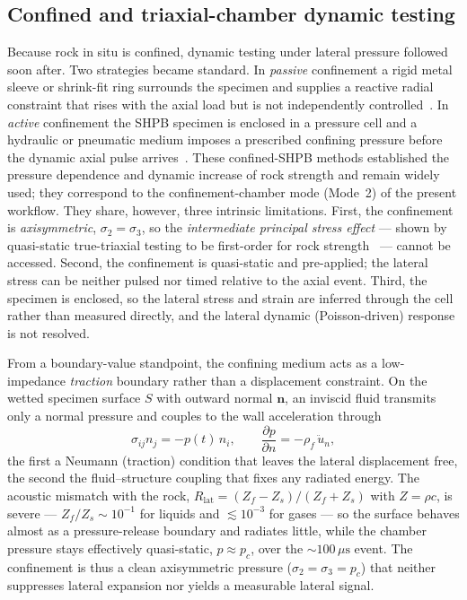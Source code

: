 \documentclass[11pt]{article}
\begin{document}
\subsection{Confined and triaxial-chamber dynamic testing}

Because rock in situ is confined, dynamic testing under lateral pressure followed
soon after. Two strategies became standard. In \emph{passive} confinement a rigid
metal sleeve or shrink-fit ring surrounds the specimen and supplies a reactive
radial constraint that rises with the axial load but is not independently
controlled~\citep{christensen1972}. In \emph{active} confinement the SHPB specimen
is enclosed in a pressure cell and a hydraulic or pneumatic medium imposes a
prescribed confining pressure before the dynamic axial pulse
arrives~\citep{lindholm1974}. These confined-SHPB methods established the pressure
dependence and dynamic increase of rock strength and remain widely used; they
correspond to the confinement-chamber mode (Mode~2) of the present workflow. They
share, however, three intrinsic limitations. First, the confinement is
\emph{axisymmetric}, $\sigma_2=\sigma_3$, so the \emph{intermediate principal
stress effect} --- shown by quasi-static true-triaxial testing to be first-order
for rock strength~\citep{mogi1971} --- cannot be accessed. Second, the confinement
is quasi-static and pre-applied; the lateral stress can be neither pulsed nor
timed relative to the axial event. Third, the specimen is enclosed, so the
lateral stress and strain are inferred through the cell rather than measured
directly, and the lateral dynamic (Poisson-driven) response is not resolved.

From a boundary-value standpoint, the confining medium acts as a low-impedance
\emph{traction} boundary rather than a displacement constraint. On the wetted
specimen surface $S$ with outward normal $\mathbf{n}$, an inviscid fluid transmits
only a normal pressure and couples to the wall acceleration through
\begin{equation}
\sigma_{ij}n_j=-p(t)\,n_i,\qquad
\frac{\partial p}{\partial n}=-\rho_f\,\ddot{u}_n,
\label{eq:fluidbc}
\end{equation}
the first a Neumann (traction) condition that leaves the lateral displacement
free, the second the fluid--structure coupling that fixes any radiated energy.
The acoustic mismatch with the rock, $R_{\mathrm{lat}}=(Z_f-Z_s)/(Z_f+Z_s)$ with
$Z=\rho c$, is severe --- $Z_f/Z_s\sim10^{-1}$ for liquids and $\lesssim10^{-3}$
for gases --- so the surface behaves almost as a pressure-release boundary and
radiates little, while the chamber pressure stays effectively quasi-static,
$p\approx p_c$, over the $\sim\!100\,\mu\mathrm{s}$ event. The confinement is thus
a clean axisymmetric pressure ($\sigma_2=\sigma_3=p_c$) that neither suppresses
lateral expansion nor yields a measurable lateral signal.
\end{document}
